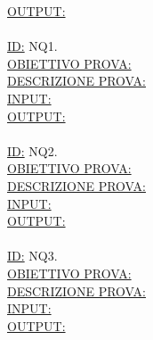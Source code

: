 \documentclass[11pt,titlepage,a4paper]{report}
\begin{document}
\underline{OUTPUT:}  \\
\\
\underline{ID:} NQ1.\\
\underline{OBIETTIVO PROVA:}  \\
\underline{DESCRIZIONE PROVA:}  \\
\underline{INPUT:}  \\
\underline{OUTPUT:}  \\
\\
\underline{ID:} NQ2.\\
\underline{OBIETTIVO PROVA:}  \\
\underline{DESCRIZIONE PROVA:}  \\
\underline{INPUT:}  \\
\underline{OUTPUT:}  \\
\\
\underline{ID:} NQ3.\\
\underline{OBIETTIVO PROVA:}  \\
\underline{DESCRIZIONE PROVA:}  \\
\underline{INPUT:}  \\
\underline{OUTPUT:}  \\
\\
\end{document}
